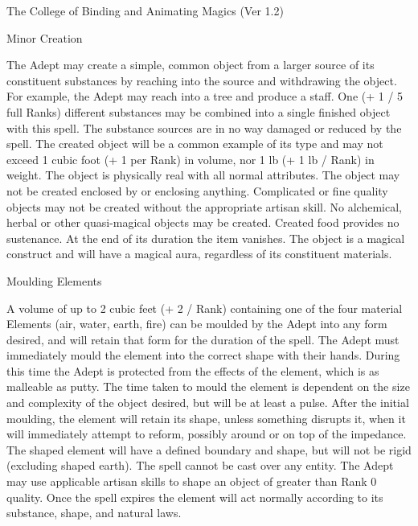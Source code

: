 \begin{Chapter}{The College of Binding and Animating Magics (Ver 1.2)}
\begin{spell}[G-7]{Minor Creation}
\begin{effects}
The Adept may create a simple, common object from a larger source of
its constituent substances by reaching into the source and withdrawing
the object.  For example, the Adept may reach into a tree and produce
a staff.  One (+ 1 / 5 full Ranks) different substances may be
combined into a single finished object with this spell.  The substance
sources are in no way damaged or reduced by the spell.  The created
object will be a common example of its type and may not exceed 1 cubic
foot (+ 1 per Rank) in volume, nor 1 lb (+ 1 lb / Rank) in weight.
The object is physically real with all normal attributes. The object
may not be created enclosed by or enclosing anything. Complicated or
fine quality objects may not be created without the appropriate
artisan skill.  No alchemical, herbal or other quasi-magical objects
may be created.  Created food provides no sustenance. At the end of
its duration the item vanishes. The object is a magical construct and
will have a magical aura, regardless of its constituent materials.
\end{effects}
\end{spell}

\begin{spell}[G-8]{Moulding Elements }

\begin{effects}
A volume of up to 2 cubic feet (+ 2 / Rank) containing one of the four
material Elements (air, water, earth, fire) can be moulded by the
Adept into any form desired, and will retain that form for the
duration of the spell. The Adept must immediately mould the element
into the correct shape with their hands. During this time the Adept is
protected from the effects of the element, which is as malleable as
putty.  The time taken to mould the element is dependent on the size
and complexity of the object desired, but will be at least a pulse.
After the initial moulding, the element will retain its shape, unless
something disrupts it, when it will immediately attempt to reform,
possibly around or on top of the impedance.  The shaped element will
have a defined boundary and shape, but will not be rigid (excluding
shaped earth). The spell cannot be cast over any entity. The Adept may
use applicable artisan skills to shape an object of greater than Rank
0 quality. Once the spell expires the element will act normally
according to its substance, shape, and natural laws.
\end{effects}
\end{spell}


\end{Chapter}
